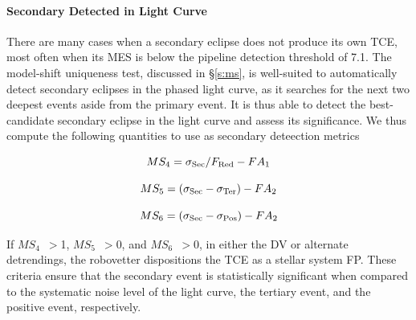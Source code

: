 \paragraph{Secondary Detected in Light Curve}
\label{secdetectsec}
\label{s:second}

There are many cases when a secondary eclipse does not produce its own TCE, most often when its MES is below the \kepler{} pipeline detection threshold of 7.1. The model-shift uniqueness test, discussed in \S\ref{s:ms}, is well-suited to automatically detect secondary eclipses in the phased light curve, as it searches for the next two deepest events aside from the primary event. It is thus able to detect the best-candidate secondary eclipse in the light curve and assess its significance. We thus compute the following quantities to use as secondary deteection metrics

\begin{equation}
    MS_{4} = \sigma_{\rm Sec}/F_{\rm Red} - FA_{1}
\end{equation}

\begin{equation}
    MS_{5} = (\sigma_{\rm Sec} - \sigma_{\rm Ter}) - FA_{2}
\end{equation}

\begin{equation}
    MS_{6} = (\sigma_{\rm Sec} - \sigma_{\rm Pos}) - FA_{2}
\end{equation}

If $MS_{4}$~$>$1, $MS_{5}$~$>$0, and $MS_{6}$~$>$0, in either the DV or alternate detrendings, the robovetter dispositions the TCE as a stellar system FP. These criteria ensure that the secondary event is statistically significant when compared to the systematic noise level of the light curve, the tertiary event, and the positive event, respectively.

